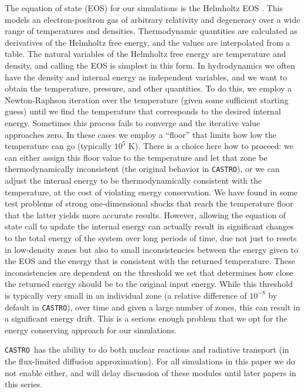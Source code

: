 \documentclass[iop]{../emulateapj}
\newcommand{\castro}{\texttt{CASTRO}}
\begin{document}
The equation of state (EOS) for our simulations is the Helmholtz EOS
\citep{timmes_swesty:2000}. This models an electron-positron gas of
arbitrary relativity and degeneracy over a wide range of temperatures
and densities. Thermodynamic quantities are calculated as derivatives
of the Helmholtz free energy, and the values are interpolated from a
table. The natural variables of the Helmholtz free energy are
temperature and density, and calling the EOS is simplest in this
form. In hydrodynamics we often have the density and
internal energy as independent variables, and we want to obtain the
temperature, pressure, and other quantities. To do this, we employ a
Newton-Raphson iteration over the temperature (given some sufficient
starting guess) until we find the temperature that corresponds to the
desired internal energy. Sometimes this process fails to converge and
the iterative value approaches zero. In these cases we employ a
``floor'' that limits how low the temperature can go (typically 
$10^5$ K). There is a choice here how to proceed: we can either
assign this floor value to the temperature and let that zone be
thermodynamically inconsistent (the original behavior in \castro), or
we can adjust the internal energy to be thermodynamically consistent
with the temperature, at the cost of violating energy conservation. We
have found in some test problems of strong one-dimensional shocks that reach 
the temperature floor that the latter yields more accurate results. 
However, allowing the equation of state call to update the 
internal energy can actually result in significant changes to the 
total energy of the system over long periods of time, 
due not just to resets in low-density zones but also to small 
inconsistencies between the energy given to the EOS and the energy 
that is consistent with the returned temperature. These inconsistencies
are dependent on the threshold we set that determines how close the 
returned energy should be to the original input energy. While this 
threshold is typically very small in an individual zone (a relative 
difference of $10^{-8}$ by default in \castro), over time and given 
a large number of zones, this can result in a significant energy 
drift. This is a serious enough problem that we opt for the energy 
conserving approach for our simulations.

\castro\ has the ability to do both nuclear reactions and radiative 
transport (in the flux-limited diffusion approximation). For all simulations 
in this paper we do not enable either, and will delay discussion of 
these modules until later papers in this series.
\end{document}

